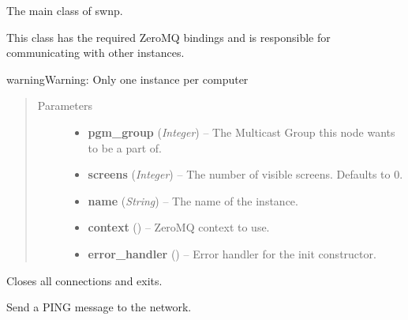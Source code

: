 \documentclass[letterpaper,10pt,english]{sphinxmanual}
\begin{document}

\begin{fulllineitems}
\label{swnp:swnp.SWNP}
The main class of swnp.

This class has the required ZeroMQ bindings and is responsible for
communicating with other instances.

\begin{notice}{warning}{Warning:}
Only one instance per computer
\end{notice}
\begin{quote}\begin{description}
\item[{Parameters}] \leavevmode\begin{itemize}
\item {} 
\textbf{pgm\_group} (\emph{Integer}) -- The Multicast Group this node wants to be a part of.

\item {} 
\textbf{screens} (\emph{Integer}) -- The number of visible screens. Defaults to 0.

\item {} 
\textbf{name} (\emph{String}) -- The name of the instance.

\item {} 
\textbf{context} () -- ZeroMQ context to use.

\item {} 
\textbf{error\_handler} () -- Error handler for the init constructor.

\end{itemize}

\end{description}\end{quote}

\begin{fulllineitems}
\label{swnp:swnp.SWNP.close}
Closes all connections and exits.

\end{fulllineitems}


\begin{fulllineitems}
\label{swnp:swnp.SWNP.do_ping}
Send a PING message to the network.


\end{fulllineitems}
\end{fulllineitems}
\end{document}
